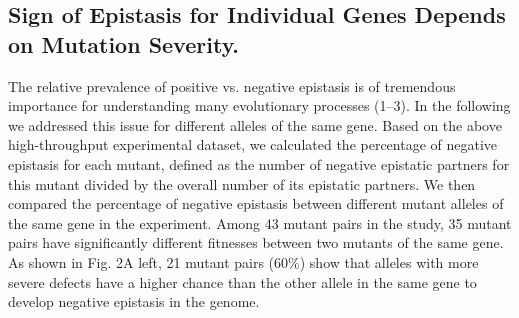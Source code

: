 \subsection{Sign of Epistasis for Individual Genes Depends on Mutation
Severity.}

The relative prevalence of positive vs. negative epistasis is of
tremendous importance for understanding many evolutionary processes
(1–3). In the following we addressed this issue for different alleles
of the same gene. Based on the above high-throughput experimental
dataset, we calculated the percentage of negative epistasis for each
mutant, defined as the number of negative epistatic partners for this
mutant divided by the overall number of its epistatic partners. We
then compared the percentage of negative epistasis between different
mutant alleles of the same gene in the experiment. Among 43 mutant
pairs in the study, 35 mutant pairs have significantly different
fitnesses between two mutants of the same gene. As shown in Fig. 2A
left, 21 mutant pairs (60\%) show that alleles with more severe
defects have a higher chance than the other allele in the same gene to
develop negative epistasis in the genome.


